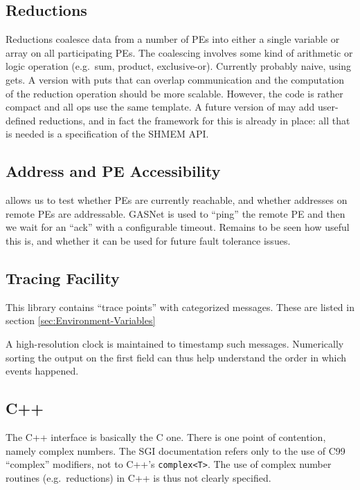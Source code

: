 \subsection{Reductions}

Reductions coalesce data from a number of PEs into either a single
variable or array on all participating PEs. The coalescing involves
some kind of arithmetic or logic operation (e.g.\ sum, product,
exclusive-or).  Currently probably naive, using gets. A version with
puts that can overlap communication and the computation of the
reduction operation should be more scalable. However, the code is
rather compact and all ops use the same template. A future version of
\openshmem may add user-defined reductions, and in fact the framework
for this is already in place: all that is needed is a specification of
the SHMEM API.

\subsection{Address and PE Accessibility}

\openshmem allows us to test whether PEs are currently reachable, and
whether addresses on remote PEs are addressable. GASNet is used to
``ping'' the remote PE and then we wait for an ``ack'' with a
configurable timeout. Remains to be seen how useful this is, and
whether it can be used for future fault tolerance issues.

\subsection{Tracing Facility}

This library contains \textquotedblleft{}trace
points\textquotedblright{} with categorized messages. These are listed
in section \ref{sec:Environment-Variables}

A high-resolution clock is maintained to timestamp such messages.
Numerically sorting the output on the first field can thus help
understand the order in which events happened.

\subsection{C++}

The C++ interface is basically the C one. There is one point of
contention, namely complex numbers. The SGI documentation refers only
to the use of C99~\cite{c99} ``complex'' modifiers, not to C++'s
\texttt{complex<T>}.  The use of complex number routines
(e.g.\ reductions) in C++ is thus not clearly specified.

